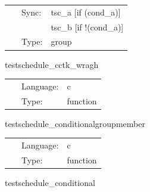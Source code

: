 \hspace{5mm}{\it test conditional clauses in schedule groups } 


\hspace{5mm}

 \begin{tabular*}{160mm}{cll} 
~ & Sync:  & tsc\_a [if (cond\_a)] \\ 
~& ~ &tsc\_b [if !(cond\_a)]\\ 
~ & Type:  & group \\ 
\end{tabular*} 


\vspace{5mm}


\hspace{5mm} testschedule\_cctk\_wragh 

\hspace{5mm}{\it test to see if function is placed in schedule and run at cctk\_wragh } 


\hspace{5mm}

 \begin{tabular*}{160mm}{cll} 
~ & Language:  & c \\ 
~ & Type:  & function \\ 
\end{tabular*} 


\vspace{5mm}


\hspace{5mm} testschedule\_conditionalgroupmember 

\hspace{5mm}{\it record that the schedule group with conditional clauses is executed } 


\hspace{5mm}

 \begin{tabular*}{160mm}{cll} 
~ & Language:  & c \\ 
~ & Type:  & function \\ 
\end{tabular*} 


\vspace{5mm}


\hspace{5mm} testschedule\_conditional 

